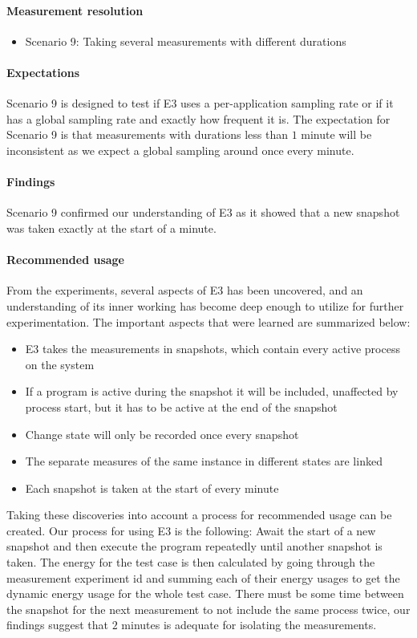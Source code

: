 \paragraph{Measurement resolution}

\begin{itemize}
    \item Scenario 9: Taking several measurements with different durations
\end{itemize}

\paragraph{Expectations}
Scenario 9 is designed to test if E3 uses a per-application sampling rate or if it has a global sampling rate and exactly how frequent it is. The expectation for Scenario 9 is that measurements with durations less than $1$ minute will be inconsistent as we expect a global sampling around once every minute.

\paragraph{Findings}
Scenario 9 confirmed our understanding of E3 as it showed that a new snapshot was taken exactly at the start of a minute.

\paragraph {Recommended usage}
From the experiments, several aspects of E3 has been uncovered, and an understanding of its inner working has become deep enough to utilize for further experimentation. The important aspects that were learned are summarized below:


\begin{itemize}
    \item E3 takes the measurements in snapshots, which contain every active process on the system
    \item If a program is active during the snapshot it will be included, unaffected by process start, but it has to be active at the end of the snapshot
    \item Change state will only be recorded once every snapshot
    \item The separate measures of the same instance in different states are linked
    \item Each snapshot is taken at the start of every minute
\end{itemize} 

Taking these discoveries into account a process for recommended usage can be created. Our process for using E3 is the following: Await the start of a new snapshot and then execute the program repeatedly until another snapshot is taken. The energy for the test case is then calculated by going through the measurement experiment id and summing each of their energy usages to get the dynamic energy usage for the whole test case. There must be some time between the snapshot for the next measurement to not include the same process twice, our findings suggest that $2$ minutes is adequate for isolating the measurements.    